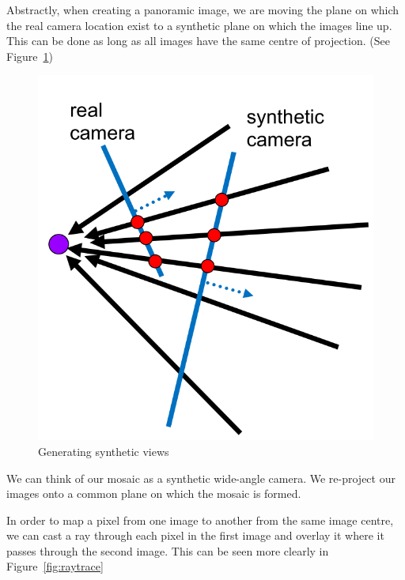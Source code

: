 \documentclass{article}
\begin{document}
 Abstractly, when creating a panoramic image, we are moving the plane on which the real camera location exist to a synthetic plane on which the images line up. This can be done as long as all images have the same centre of projection. (See Figure~\ref{fig:synthview})

\begin{figure}[ht]
  \centering
  \includegraphics[scale=0.4]{figures/l5-1.png}
  \caption{\label{fig:synthview} Generating synthetic views}
\end{figure}

We can think of our mosaic as a synthetic wide-angle camera. We re-project our images onto a common plane on which the mosaic is formed.

In order to map a pixel from one image to another from the same image centre, we can cast a ray through each pixel in the first image and overlay it where it passes through the second image. This can be seen more clearly in Figure~\ref{fig:raytrace}
\end{document}
